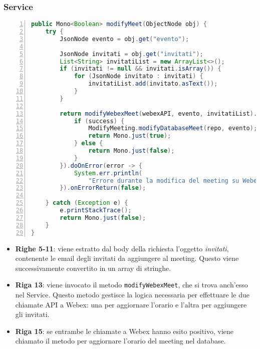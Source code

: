 \subsubsection{Service}
\begin{lstlisting}[language=java, frame=lines, basicstyle=\ttfamily\scriptsize, numbers=left]
public Mono<Boolean> modifyMeet(ObjectNode obj) {
    try {
        JsonNode evento = obj.get("evento");
        
        JsonNode invitati = obj.get("invitati");    
        List<String> invitatiList = new ArrayList<>();
        if (invitati != null && invitati.isArray()) {
            for (JsonNode invitato : invitati) {
                invitatiList.add(invitato.asText());
            }
        }

        return modifyWebexMeet(webexAPI, evento, invitatiList).flatMap(success -> {
            if (success) {
                ModifyMeeting.modifyDatabaseMeet(repo, evento);
                return Mono.just(true);
            } else {
                return Mono.just(false);
            }
        }).doOnError(error -> {
            System.err.println(
                "Errore durante la modifica del meeting su Webex: " + error.getMessage());
        }).onErrorReturn(false);

    } catch (Exception e) {
        e.printStackTrace();
        return Mono.just(false);
    }
}
\end{lstlisting}
\begin{itemize}
    \item \textbf{Righe 5-11}: viene estratto dal body della richiesta l'oggetto \textit{invitati}, 
    contenente le email degli invitati da aggiungere al meeting. Questo viene successivamente convertito in un array di stringhe.
    
    \item \textbf{Riga 13}:  viene invocato il metodo \texttt{modifyWebexMeet}, che si trova anch'esso nel Service. 
    Questo metodo gestisce la logica necessaria per effettuare le due chiamate API a Webex: una per aggiornare 
    l'orario e l'altra per aggiungere gli invitati.

    \item \textbf{Riga 15}: se entrambe le chiamate a Webex hanno esito positivo, 
    viene chiamato il metodo per aggiornare l'orario del meeting nel database.
\end{itemize}